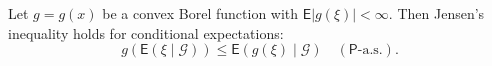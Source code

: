 Let $g = g(x)$ be a convex Borel function with $\mathsf{E}|g(\xi)| < \infty$. Then Jensen's inequality holds for conditional expectations:
$$g(\mathsf{E}(\xi \mid \mathcal{G})) \leq \mathsf{E}(g(\xi) \mid \mathcal{G}) \quad (\mathsf{P}\text{-a.s.}).$$
